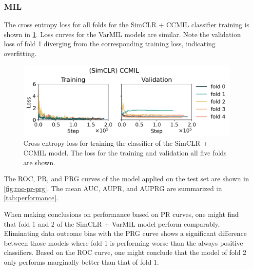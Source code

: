 \subsubsection{MIL}

The cross entropy loss for all folds for the SimCLR + CCMIL classifier training is shown in \cref{fig:simclr-ccmil-loss}.
Loss curves for the VarMIL models are similar.
Note the validation loss of fold 1 diverging from the corresponding training loss, indicating overfitting.

\begin{figure}
    \centering
    \includegraphics[width=\linewidth]{pediatric-brain-tumours/images/simclr+ccmil-loss.png}
    \caption[Training loss CCMIL]{
        Cross entropy loss for training the classifier of the SimCLR + CCMIL model.
        The loss for the training and validation all five folds are shown.
    }
    \label{fig:simclr-ccmil-loss}
\end{figure}

The ROC, PR, and PRG curves of the model applied on the test set are shown in \cref{fig:roc-pr-prg}.
The mean AUC, AUPR, and AUPRG are summarized in \cref{tab:performance}.

When making conclusions on performance based on PR curves, one might find that fold 1 and 2 of the SimCLR + VarMIL model perform comparably.
Eliminating data outcome bias with the PRG curve shows a significant difference between those models where fold 1 is performing worse than the always positive classifiers.
Based on the ROC curve, one might conclude that the model of fold 2 only performs marginally better than that of fold 1.

